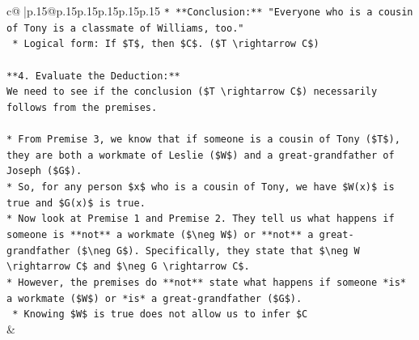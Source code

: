\documentclass{article}
\begin{document}
{\begin{supertabular}{c@{$\;$}|p{.15\linewidth}@{}p{.15\linewidth}p{.15\linewidth}p{.15\linewidth}p{.15\linewidth}p{.15\linewidth}}
{{{\texttt{*   **Conclusion:** "Everyone who is a cousin of Tony is a classmate of Williams, too."} \\
\texttt{    *   Logical form: If \$T\$, then \$C\$. (\$T \textbackslash{}rightarrow C\$)} \\
\\ 
\texttt{**4. Evaluate the Deduction:**} \\
\texttt{We need to see if the conclusion (\$T \textbackslash{}rightarrow C\$) necessarily follows from the premises.} \\
\\ 
\texttt{*   From Premise 3, we know that if someone is a cousin of Tony (\$T\$), they are both a workmate of Leslie (\$W\$) and a great{-}grandfather of Joseph (\$G\$).} \\
\texttt{*   So, for any person \$x\$ who is a cousin of Tony, we have \$W(x)\$ is true and \$G(x)\$ is true.} \\
\texttt{*   Now look at Premise 1 and Premise 2. They tell us what happens if someone is **not** a workmate (\$\textbackslash{}neg W\$) or **not** a great{-}grandfather (\$\textbackslash{}neg G\$). Specifically, they state that \$\textbackslash{}neg W \textbackslash{}rightarrow C\$ and \$\textbackslash{}neg G \textbackslash{}rightarrow C\$.} \\
\texttt{*   However, the premises do **not** state what happens if someone *is* a workmate (\$W\$) or *is* a great{-}grandfather (\$G\$).} \\
\texttt{    *   Knowing \$W\$ is true does not allow us to infer \$C} \\
            }
        }
    }
    & \\ \\


\end{supertabular}}
\end{document}

